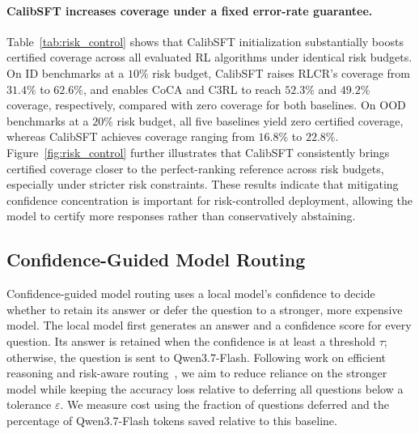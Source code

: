 \documentclass{article} %
\begin{document}
\paragraph{CalibSFT increases coverage under a fixed error-rate guarantee.}
Table~\ref{tab:risk_control} shows that CalibSFT initialization substantially boosts certified coverage across all evaluated RL algorithms under identical risk budgets.
On ID benchmarks at a $10\%$ risk budget, CalibSFT raises RLCR's coverage from $31.4\%$ to $62.6\%$, and enables CoCA and C3RL to reach $52.3\%$ and $49.2\%$ coverage, respectively, compared with zero coverage for both baselines.
On OOD benchmarks at a $20\%$ risk budget, all five baselines yield zero certified coverage, whereas CalibSFT achieves coverage ranging from $16.8\%$ to $22.8\%$.
Figure~\ref{fig:risk_control} further illustrates that CalibSFT consistently brings certified coverage closer to the perfect-ranking reference across risk budgets, especially under stricter risk constraints.
These results indicate that mitigating confidence concentration is important for risk-controlled deployment, allowing the model to certify more responses rather than conservatively abstaining.




\subsection{Confidence-Guided Model Routing}
\label{sec:model_routing}

Confidence-guided model routing uses a local model's confidence to
decide whether to retain its answer or defer the question to a stronger,
more expensive model. The local model first generates an answer and a
confidence score for every question. Its answer is retained when the
confidence is at least a threshold $\tau$; otherwise, the question is
sent to Qwen3.7-Flash. Following work on efficient reasoning and risk-aware
routing~\citep{yu2026anytime,zeng2026on,hao2026racer}, we aim to
reduce reliance on the stronger model while keeping the accuracy loss
relative to deferring all questions below a tolerance $\varepsilon$.
We measure cost using the fraction of questions deferred and the
percentage of Qwen3.7-Flash tokens saved relative to this baseline.
\end{document}
